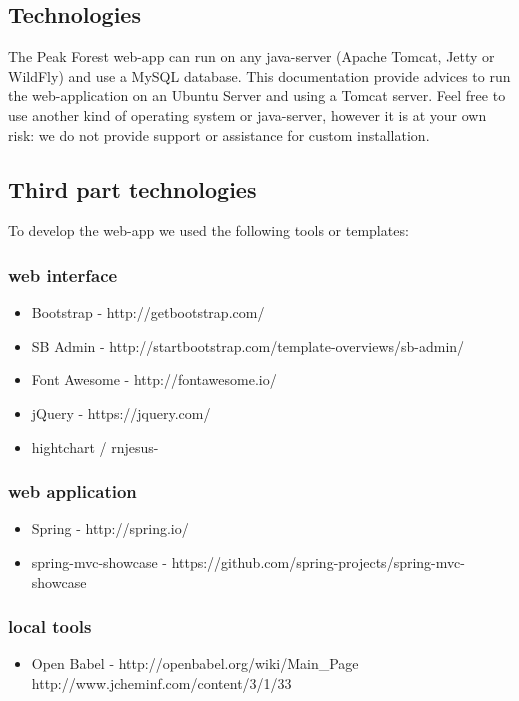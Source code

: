 \subsection{Technologies}
The Peak Forest web-app can run on any java-server (Apache Tomcat, Jetty or WildFly) and use a MySQL database. %
This documentation provide advices to run the web-application on an Ubuntu Server and using a Tomcat server. 
Feel free to use another kind of operating system or java-server, however it is at your own risk: 
we do not provide support or assistance for custom installation.

\subsection{Third part technologies}
To develop the web-app we used the following tools or templates:
\subsubsection{web interface}
\begin{itemize}
	\item Bootstrap - http://getbootstrap.com/
	\item SB Admin - http://startbootstrap.com/template-overviews/sb-admin/
	\item Font Awesome - http://fontawesome.io/
	\item jQuery - https://jquery.com/
	\item hightchart / rnjesus-
\end{itemize} 

\subsubsection{web application}
\begin{itemize}
	\item Spring - http://spring.io/
	\item spring-mvc-showcase - https://github.com/spring-projects/spring-mvc-showcase
\end{itemize} 

\subsubsection{local tools}
\begin{itemize}
	\item Open Babel - http://openbabel.org/wiki/Main\_Page http://www.jcheminf.com/content/3/1/33
\end{itemize} 

